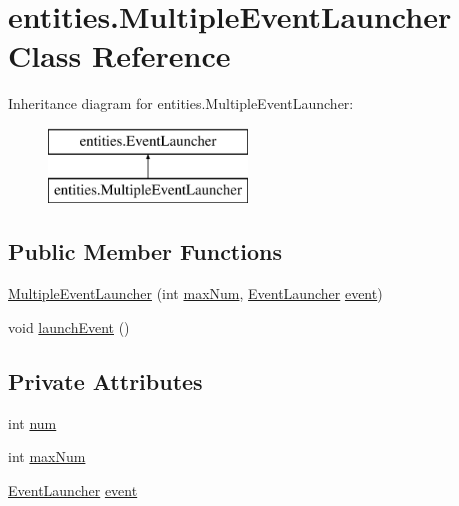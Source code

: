 \hypertarget{classentities_1_1_multiple_event_launcher}{}\section{entities.\+Multiple\+Event\+Launcher Class Reference}
\label{classentities_1_1_multiple_event_launcher}
Inheritance diagram for entities.\+Multiple\+Event\+Launcher\+:\begin{figure}[H]
\begin{center}
\leavevmode
\includegraphics[height=2.000000cm]{classentities_1_1_multiple_event_launcher}
\end{center}
\end{figure}
\subsection*{Public Member Functions}
\begin{DoxyCompactItemize}
\item 
\mbox{\hyperlink{classentities_1_1_multiple_event_launcher_a9ccdc84e550b1c2de8d96d4fe52adc1c}{Multiple\+Event\+Launcher}} (int \mbox{\hyperlink{classentities_1_1_multiple_event_launcher_a236cd02f077a8fcc6afbfb425817a4f3}{max\+Num}}, \mbox{\hyperlink{interfaceentities_1_1_event_launcher}{Event\+Launcher}} \mbox{\hyperlink{classentities_1_1_multiple_event_launcher_a2b7fce6ca63ed808d27e9d1d0469ce4a}{event}})
\item 
void \mbox{\hyperlink{classentities_1_1_multiple_event_launcher_a04d341ee9976ef057ab55b74ae99e6db}{launch\+Event}} ()
\end{DoxyCompactItemize}
\subsection*{Private Attributes}
\begin{DoxyCompactItemize}
\item 
int \mbox{\hyperlink{classentities_1_1_multiple_event_launcher_a35cd67fc18c6015e136245890bbdd9b1}{num}}
\item 
int \mbox{\hyperlink{classentities_1_1_multiple_event_launcher_a236cd02f077a8fcc6afbfb425817a4f3}{max\+Num}}
\item 
\mbox{\hyperlink{interfaceentities_1_1_event_launcher}{Event\+Launcher}} \mbox{\hyperlink{classentities_1_1_multiple_event_launcher_a2b7fce6ca63ed808d27e9d1d0469ce4a}{event}}
\end{DoxyCompactItemize}



